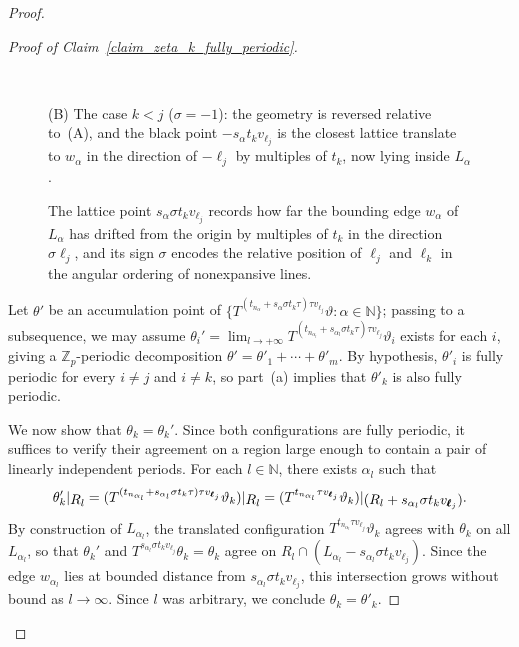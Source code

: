 \documentclass[12pt]{amsart}
\numberwithin{equation}{section}
\newcommand{\bb}[1]{\mathbb{#1}}
\newcommand{\sob}[1]{\ensuremath{{\mathbin |}\raise-.4ex\hbox{$#1$}}}
\begin{document}
\begin{proof}
\begin{proof}[Proof of Claim~\ref{claim_zeta_k_fully_periodic}]
\begin{figure}[ht]
\begin{minipage}[t]{0.47\linewidth}
	\end{minipage} 
	\hfill
	\begin{minipage}[t]{0.47\linewidth}
		\begin{center}
			\def\svgwidth{6.8cm}\\
		\end{center}
		\small{(B) The case $k<j$ ($\sigma = -1$): the geometry is reversed relative to~(A), and the black point $-s_{\alpha}t_k v_{\pmb{\ell}_{j}}$ is the closest lattice translate to $w_{\alpha}$ in the direction of $-\pmb{\ell}_j$ by multiples of $ t_k $, now lying inside $L_{\alpha}$.}
	\end{minipage}
	\caption{The lattice point $s_\alpha \sigma t_k v_{\pmb{\ell}_j}$ records how far the bounding edge $w_\alpha$ of $L_\alpha$ has drifted from the origin by multiples of $ t_k $ in the direction $\sigma \pmb{\ell}_{j}$, and its sign $ \sigma $ encodes the relative position of $\ell_j$ and $\ell_k$ in the angular ordering of nonexpansive lines.}
	\label{fig2}
\end{figure}
Let $\theta'$ be an accumulation point of $\{T^{(t_{n_{\alpha}}+s_{\alpha} \sigma t_k\tau)\tau v_{\pmb{\ell}_{j}}}\vartheta : \alpha \in \bb{N}\}$; passing to a subsequence, we may assume $\theta_i' = \lim_{l \to +\infty} T^{(t_{n_{\alpha_l}}+s_{\alpha_l} \sigma t_k\tau)\tau v_{\pmb{\ell}_{j}}}\vartheta_i $ exists for each $ i $, giving a $\bb{Z}_p$-periodic decomposition $\theta' = \theta'_1 +\cdots+\theta'_m$. By hypothesis, $\theta'_i$ is fully periodic for every $i \neq j$ and $i \neq k$, so part~(a) implies that $\theta'_k$ is also fully periodic. 

We now show that $ \theta_k = \theta_k' $. Since both configurations are fully periodic, it suffices to verify their agreement on a region large enough to contain a pair of linearly independent periods. 
For each $l \in \bb{N}$, there exists $\alpha_l$ such that $$\theta'_k\sob{R_l} = (T^{(t_{n_{\alpha_l}}+s_{\alpha_l} \sigma t_k\tau)\tau v_{\pmb{\ell}_{j}}}\vartheta_k)\sob{R_l} = (T^{t_{n_{\alpha_l}}\tau v_{\pmb{\ell}_{j}}}\vartheta_k)\sob{(R_l+s_{\alpha_l}\sigma t_k v_{\pmb{\ell}_{j}})}.$$ 
By construction of $ L_{\alpha_l} $, the translated configuration $ T^{t_{n_{\alpha_l}}\tau v_{\pmb{\ell}_{j}}}\vartheta_k $ agrees with $ \theta_k $ on all $ L_{\alpha_l} $, so that $ \theta_k' $ and $T^{s_{\alpha_l}\sigma t_kv_{\pmb{\ell}_j}} \theta_k = \theta_k$ agree on $R_l \cap (L_{\alpha_l} - s_{\alpha_l}\sigma t_kv_{\pmb{\ell}_{j}})$. Since the edge $ w_{\alpha_l} $ lies at bounded distance from $ s_{\alpha_l}\sigma t_kv_{\pmb{\ell}_{j}} $, this intersection grows without bound as $ l \to \infty $. Since $ l $ was arbitrary, we conclude $\theta_k = \theta'_k $. 


\end{proof}
\end{proof}
\end{document}
